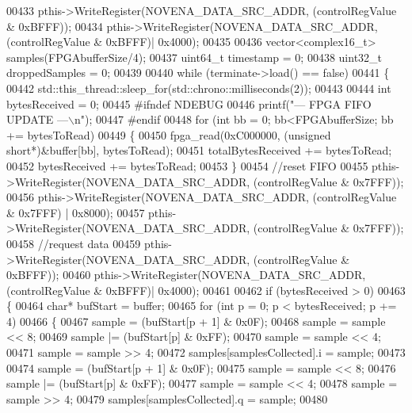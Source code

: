 \begin{DoxyCode}
{{{{{{{{{{{00433     pthis->WriteRegister(NOVENA\_DATA\_SRC\_ADDR, (controlRegValue & 0xBFFF));
00434     pthis->WriteRegister(NOVENA\_DATA\_SRC\_ADDR, (controlRegValue & 0xBFFF)| 0x4000);
00435 
00436     vector<complex16\_t> samples(FPGAbufferSize/4);
00437     uint64\_t timestamp = 0;
00438     uint32\_t droppedSamples = 0;
00439 
00440     \textcolor{keywordflow}{while} (terminate->load() == \textcolor{keyword}{false})
00441     \{
00442         std::this\_thread::sleep\_for(std::chrono::milliseconds(2));
00443 
00444         \textcolor{keywordtype}{int} bytesReceived = 0;
00445 \textcolor{preprocessor}{#ifndef NDEBUG}
00446         printf(\textcolor{stringliteral}{"--- FPGA FIFO UPDATE ---\(\backslash\)n"});
00447 \textcolor{preprocessor}{#endif}
00448         \textcolor{keywordflow}{for} (\textcolor{keywordtype}{int} bb = 0; bb<FPGAbufferSize; bb += bytesToRead)
00449         \{
00450             fpga_read(0xC000000, (\textcolor{keywordtype}{unsigned} \textcolor{keywordtype}{short}*)&buffer[bb], bytesToRead);
00451             totalBytesReceived += bytesToRead;
00452             bytesReceived += bytesToRead;
00453         \}
00454     \textcolor{comment}{//reset FIFO}
00455         pthis->WriteRegister(NOVENA\_DATA\_SRC\_ADDR, (controlRegValue & 0x7FFF));
00456         pthis->WriteRegister(NOVENA\_DATA\_SRC\_ADDR, (controlRegValue & 0x7FFF) | 0x8000);
00457         pthis->WriteRegister(NOVENA\_DATA\_SRC\_ADDR, (controlRegValue & 0x7FFF));
00458         \textcolor{comment}{//request data}
00459         pthis->WriteRegister(NOVENA\_DATA\_SRC\_ADDR, (controlRegValue & 0xBFFF));
00460         pthis->WriteRegister(NOVENA\_DATA\_SRC\_ADDR, (controlRegValue & 0xBFFF)| 0x4000);
00461 
00462         \textcolor{keywordflow}{if} (bytesReceived > 0)
00463         \{
00464             \textcolor{keywordtype}{char}* bufStart = buffer;
00465             \textcolor{keywordflow}{for} (\textcolor{keywordtype}{int} p = 0; p < bytesReceived; p += 4)
00466             \{
00467                 sample = (bufStart[p + 1] & 0x0F);
00468                 sample = sample << 8;
00469                 sample |= (bufStart[p] & 0xFF);
00470                 sample = sample << 4;
00471                 sample = sample >> 4;
00472                 samples[samplesCollected].i = sample;
00473 
00474                 sample = (bufStart[p + 1] & 0x0F);
00475                 sample = sample << 8;
00476                 sample |= (bufStart[p] & 0xFF);
00477                 sample = sample << 4;
00478                 sample = sample >> 4;
00479                 samples[samplesCollected].q = sample;
00480 
}}}}}}}}}}}
\end{DoxyCode}
